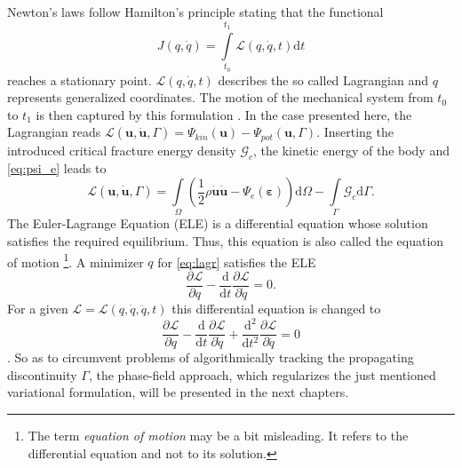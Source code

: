 Newton's laws follow Hamilton's principle stating that the functional 
\begin{equation} \label{eq:fctal_Hamilton}
	J\left(q,\dot{q}\right)=\int\limits_{t_{0}}^{t_{1}}\mathcal{L}\left(q,\dot{q},t\right)\mathrm{d}t
\end{equation} reaches a stationary point. $\mathcal{L}\left(q,\dot{q},t\right)$ describes the so called Lagrangian and $q$ represents generalized coordinates. The motion of the mechanical system from $t_{0}$ to $t_{1}$ is then captured by this formulation \citep{01_B_LagrMech}. In the case presented here, the Lagrangian reads $\mathcal{L}\left(\mathbf{u},\dot{\mathbf{u}},\Gamma\right)=\Psi_{kin}\left(\mathbf{u}\right)-\Psi_{pot}\left(\mathbf{u},\Gamma\right)$. Inserting the introduced critical fracture energy density $\mathcal{G}_{c}$, the kinetic energy of the body and \eqref{eq:psi_e} leads to
\begin{equation} \label{eq:lagr}
	\mathcal{L}\left(\mathbf{u},\dot{\mathbf{u}},\Gamma\right) = \int\limits_{\Omega}\left(\frac{1}{2}\rho\dot{\mathbf{u}}\dot{\mathbf{u}}-\Psi_{e}\left(\bm{\varepsilon}\right)\right)\mathrm{d}\Omega - \int\limits_{\Gamma}\mathcal{G}_{c}\mathrm{d}\Gamma.
\end{equation}
The Euler-Lagrange Equation (ELE) is a differential equation whose solution satisfies the required equilibrium. Thus, this equation is also called the equation of motion \footnote{The term \textit{equation of motion} may be a bit misleading. It refers to the differential equation and not to its solution.}. A minimizer $q$ for \eqref{eq:lagr} satisfies the ELE
\begin{equation} \label{eq:ELE_O2}
	\dfrac{\partial\mathcal{L}}{\partial q}-\dfrac{\mathrm{d}}{\mathrm{d}t}\dfrac{\partial\mathcal{L}}{\partial\dot{q}}=0.
\end{equation}
For a given $\mathcal{L}=\mathcal{L}\left(q,\dot{q},\ddot{q}, t\right)$ this differential equation is changed to
\begin{equation} \label{eq:ELE:_O4}
	\dfrac{\partial\mathcal{L}}{\partial q}-\dfrac{\mathrm{d}}{\mathrm{d}t}\dfrac{\partial\mathcal{L}}{\partial\dot{q}}+\dfrac{\mathrm{d}^{2}}{\mathrm{d}t^{2}}\dfrac{\partial\mathcal{L}}{\partial\ddot{q}}=0
\end{equation}
\citep{01_B_LagrMech}. So as to circumvent problems of algorithmically tracking the propagating discontinuity $\Gamma$, the phase-field approach, which regularizes the just mentioned variational formulation, will be presented in the next chapters.

